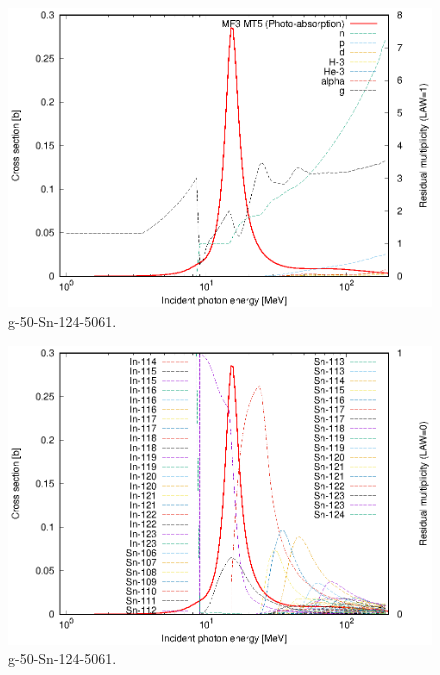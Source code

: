 \begin{figure}
 \includegraphics[width=\linewidth]{eps/g_50-Sn-124_5061.eps}
  \caption{g-50-Sn-124-5061.}
\end{figure}
\begin{figure}
 \includegraphics[width=\linewidth]{eps-law0/g_50-Sn-124_5061.eps}
 \caption{g-50-Sn-124-5061.}
\end{figure}
\newpage \clearpage

